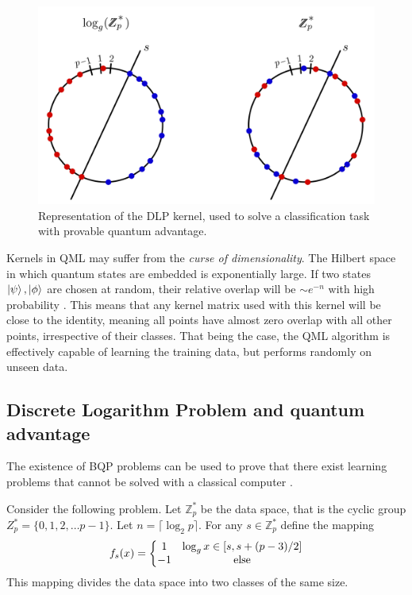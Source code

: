 \documentclass[]{report}
\begin{document}
\begin{figure}
\centering
\includegraphics[width=.6\linewidth]{images/DLP}
\caption{Representation of the DLP kernel, used to solve a classification task with provable quantum advantage. }
\label{fig.dlp}
\end{figure}

Kernels in QML may suffer from the \textit{curse of dimensionality}. The Hilbert space in which quantum states are embedded is exponentially large. If two states $\ket\psi, \ket\phi$ are chosen at random, their relative overlap will be $\sim e^{-n}$ with high probability \cite{thanasilp2024exponential}. This means that any kernel matrix used with this kernel will be close to the identity, meaning all points have almost zero overlap with all other points, irrespective of their classes. That being the case, the QML algorithm is effectively capable of learning the training data, but performs randomly on unseen data.  

\subsection{Discrete Logarithm Problem and quantum advantage}\label{sec.dlp}

The existence of BQP problems can be used to prove that there exist learning problems that cannot be solved with a classical computer \cite{liu2021rigorous}. 

Consider the following problem. Let $\mathbb Z_p^*$ be the data space, that is the cyclic group $Z_p^* = \{0, 1,2,\ldots p-1 \}$. Let $n = \lceil  \log_2 p \rceil$. For any $s \in \mathbb Z_p^*$ define the mapping
\begin{equation}
f_s(x) = \left\{ 
\begin{matrix}
1 & \log_g x \in [s, s + (p - 3) / 2] \\
-1 & {\rm else}
\end{matrix}
\right.
\end{equation}
This mapping divides the data space into two classes of the same size. 
\end{document}
